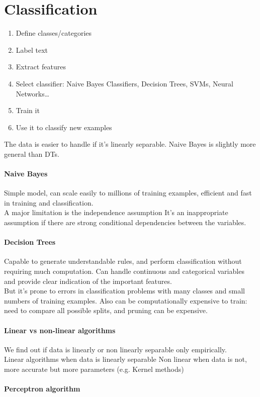 \documentclass[10pt]{report}
\begin{document}
\section{Classification}
\begin{enumerate}
	\item Define classes/categories
	\item Label text
	\item Extract features
	\item Select classifier: Naive Bayes Classifiers, Decision Trees, SVMs, Neural Networks\ldots
	\item Train it
	\item Use it to classify new examples
\end{enumerate}
The data is easier to handle if it's linearly separable. Naive Bayes is slightly more general than DTs.
\paragraph{Naive Bayes} Simple model, can scale easily to millions of training examples, efficient and fast in training and classification.\\
A major limitation is the independence assumption %
It's an inappropriate assumption if there are strong conditional dependencies between the variables.
\paragraph{Decision Trees} Capable to generate understandable rules, and perform classification without requiring much computation. Can handle continuous and categorical variables and provide clear indication of the important features.\\
But it's prone to errors in classification problems with many classes and small numbers of training examples. Also can be computationally expensive to train: need to compare all possible splits, and pruning can be expensive.
\paragraph{Linear vs non-linear algorithms} We find out if data is linearly or non linearly separable only empirically.\\
Linear algorithms when data is linearly separable %
Non linear when data is not, more accurate but more parameters (e.g. Kernel methods)
\paragraph{Perceptron algorithm} %
\end{document}

